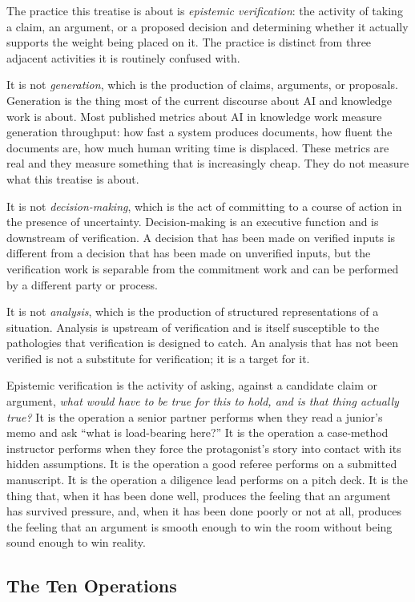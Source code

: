 \documentclass[11pt]{article}
\begin{document}
The practice this treatise is about is \emph{epistemic verification}: the activity of taking a claim, an argument, or a proposed decision and determining whether it actually supports the weight being placed on it. The practice is distinct from three adjacent activities it is routinely confused with.

It is not \emph{generation}, which is the production of claims, arguments, or proposals. Generation is the thing most of the current discourse about AI and knowledge work is about. Most published metrics about AI in knowledge work measure generation throughput: how fast a system produces documents, how fluent the documents are, how much human writing time is displaced. These metrics are real and they measure something that is increasingly cheap. They do not measure what this treatise is about.

It is not \emph{decision-making}, which is the act of committing to a course of action in the presence of uncertainty. Decision-making is an executive function and is downstream of verification. A decision that has been made on verified inputs is different from a decision that has been made on unverified inputs, but the verification work is separable from the commitment work and can be performed by a different party or process.

It is not \emph{analysis}, which is the production of structured representations of a situation. Analysis is upstream of verification and is itself susceptible to the pathologies that verification is designed to catch. An analysis that has not been verified is not a substitute for verification; it is a target for it.

Epistemic verification is the activity of asking, against a candidate claim or argument, \emph{what would have to be true for this to hold, and is that thing actually true?} It is the operation a senior partner performs when they read a junior's memo and ask ``what is load-bearing here?'' It is the operation a case-method instructor performs when they force the protagonist's story into contact with its hidden assumptions. It is the operation a good referee performs on a submitted manuscript. It is the operation a diligence lead performs on a pitch deck. It is the thing that, when it has been done well, produces the feeling that an argument has survived pressure, and, when it has been done poorly or not at all, produces the feeling that an argument is smooth enough to win the room without being sound enough to win reality.

\subsection{The Ten Operations}
\end{document}
